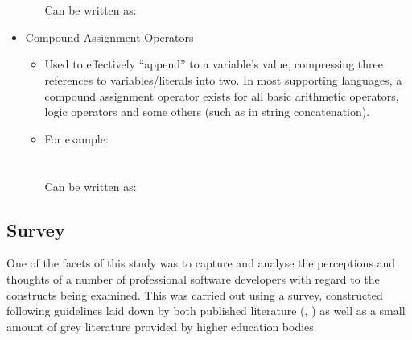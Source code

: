 \documentclass{article}
\begin{document}
\begin{itemize}
\begin{itemize}
                \\\\
                Can be written as:\\
            \end{itemize}
        \item Compound Assignment Operators
            \begin{itemize}
                \item Used to effectively ``append'' to a variable's value, compressing three references to variables/literals into two. In most supporting languages, a compound assignment operator exists for all basic arithmetic operators, logic operators and some others (such as in string concatenation).
                \item For example:\\
                \\\\
                Can be written as:\\
            \end{itemize}
    \end{itemize}

    \subsection{Survey}
    \label{subsec:survey}
        One of the facets of this study was to capture and analyse the perceptions and thoughts of a number of professional software developers with regard to the constructs being examined. This was carried out using a survey, constructed following guidelines laid down by both published literature (\cite{goodSurveys1}, \cite{goodSurveys2}) as well as a small amount of grey literature provided by higher education bodies.
\end{document}
